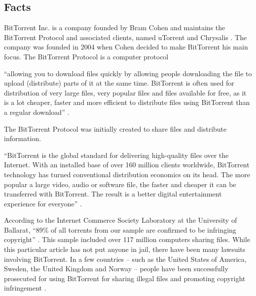 \documentclass[11pt]{article}
\begin{document}
\begin{multicols}{2}

\setcounter{page}{1}


\section{Facts}
BitTorrent Inc. is a company founded by Bram Cohen and maintains the BitTorrent Protocol and associated clients, named uTorrent and Chrysalis \cite{btabout}. The company was founded in 2004 when Cohen decided to make BitTorrent his main focus. The BitTorrent Protocol is a computer protocol

{\addtolength{\leftskip}{6mm}

``allowing you to download files quickly by allowing people downloading the file to upload (distribute) parts of it at the same time. BitTorrent is often used for distribution of very large files, very popular files and files available for free, as it is a lot cheaper, faster and more efficient to distribute files using BitTorrent than a regular download'' \cite{btabout}.

}

The BitTorrent Protocol was initially created to share files and distribute information.

{\addtolength{\leftskip}{6mm}

``BitTorrent is the global standard for delivering high-quality files over the Internet. With an installed base of over 160 million clients worldwide, BitTorrent technology has turned conventional distribution economics on its head. The more popular a large video, audio or software file, the faster and cheaper it can be transferred with BitTorrent. The result is a better digital entertainment experience for everyone'' \cite{btabout}.

}

According to the Internet Commerce Society Laboratory at the University of Ballarat, ``89\% of all torrents from our sample are confirmed to be infringing copyright'' \cite{ICSL}. This sample included over 117 million computers sharing files. While this particular article has not put anyone in jail, there have been many lawsuits involving BitTorrent. In a few countries -- such as the United States of America, Sweden, the United Kingdom and Norway -- people have been successfully prosecuted for using BitTorrent for sharing illegal files and promoting copyright infringement \cite{tpbverdict}.


\end{multicols}
\end{document}
